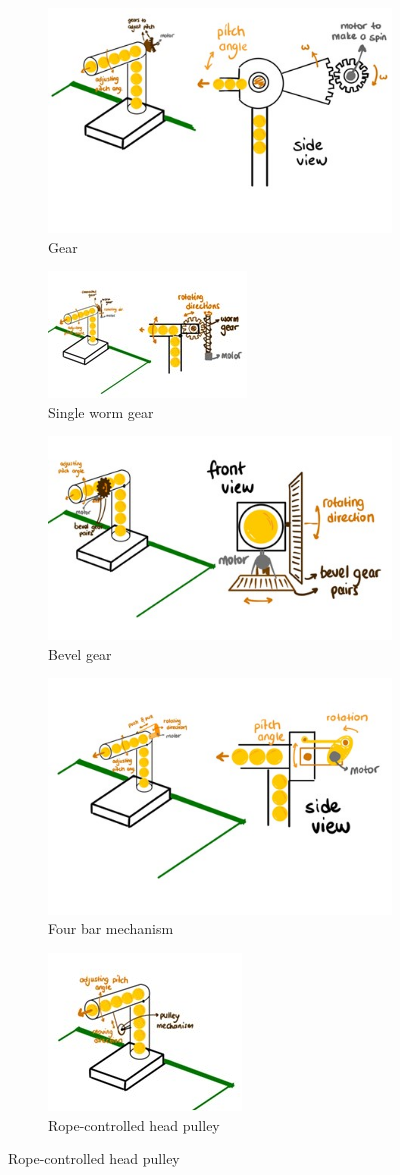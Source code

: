 \documentclass[12pt]{report}
\begin{document}
\begin{appendices}
\begin{figure}[H]
\centering
\begin{subfigure}{.5\textwidth}
  \centering
  \includegraphics[width=.4\linewidth]{gearpitch.jpg}
  \caption{Gear}
  \label{fig:gear}
\end{subfigure}%
\begin{subfigure}{.5\textwidth}
  \centering
  \includegraphics[width=.4\linewidth]{wormpitch.jpg}
  \caption{Single worm gear}
  \label{fig:worm}
\end{subfigure}
\begin{subfigure}{.5\textwidth}
  \centering
  \includegraphics[width=.4\linewidth]{bevelpitch.jpg}
  \caption{Bevel gear}
  \label{fig:bevel}
\end{subfigure}%
\begin{subfigure}{.5\textwidth}
  \centering
  \includegraphics[width=.4\linewidth]{fourbarpitch.jpg}
  \caption{Four bar mechanism}
  \label{fig:fourbar}
\end{subfigure}%

\begin{subfigure}{.5\textwidth}
  \centering
  \includegraphics[width=.4\linewidth]{ropecontrol.jpg}
  \caption{Rope-controlled head pulley}
  \label{fig:rope}
\end{subfigure}%


\end{figure}
\end{appendices}
\end{document}
